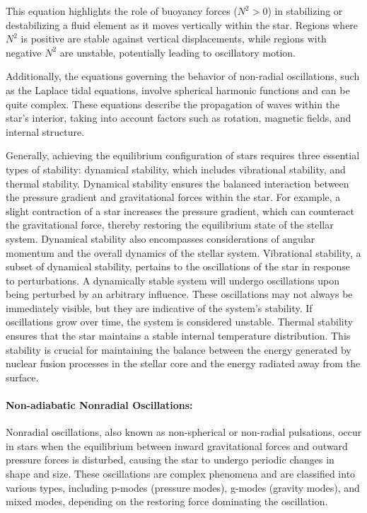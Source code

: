 \documentclass{article}
\begin{document}
This equation highlights the role of buoyancy forces (\(N^2 > 0\)) in stabilizing or destabilizing a fluid element as it moves vertically within the star. Regions where \(N^2\) is positive are stable against vertical displacements, while regions with negative \(N^2\) are unstable, potentially leading to oscillatory motion.

Additionally, the equations governing the behavior of non-radial oscillations, such as the Laplace tidal equations, involve spherical harmonic functions and can be quite complex. These equations describe the propagation of waves within the star's interior, taking into account factors such as rotation, magnetic fields, and internal structure.

Generally, achieving the equilibrium configuration of stars requires three essential types of stability: dynamical stability, which includes vibrational stability, and thermal stability. Dynamical stability ensures the balanced interaction between the pressure gradient and gravitational forces within the star. For example, a slight contraction of a star increases the pressure gradient, which can counteract the gravitational force, thereby restoring the equilibrium state of the stellar system. Dynamical stability also encompasses considerations of angular momentum and the overall dynamics of the stellar system. Vibrational stability, a subset of dynamical stability, pertains to the oscillations of the star in response to perturbations. A dynamically stable system will undergo oscillations upon being perturbed by an arbitrary influence. These oscillations may not always be immediately visible, but they are indicative of the system's stability. If oscillations grow over time, the system is considered unstable. Thermal stability ensures that the star maintains a stable internal temperature distribution. This stability is crucial for maintaining the balance between the energy generated by nuclear fusion processes in the stellar core and the energy radiated away from the surface\cite{unno1989nonradial}.

\paragraph{Non-adiabatic Nonradial Oscillations:}

Nonradial oscillations, also known as non-spherical or non-radial pulsations, occur in stars when the equilibrium between inward gravitational forces and outward pressure forces is disturbed, causing the star to undergo periodic changes in shape and size. These oscillations are complex phenomena and are classified into various types, including p-modes (pressure modes), g-modes (gravity modes), and mixed modes, depending on the restoring force dominating the oscillation. 
\end{document}
